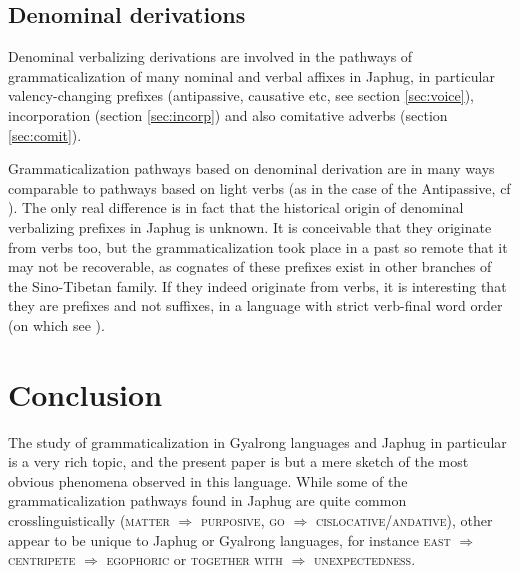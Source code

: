 \documentclass[oldfontcommands,oneside,a4paper,11pt]{article}
\begin{document}
\subsection{Denominal derivations} \label{sec:denom}
Denominal verbalizing derivations are involved in the pathways of grammaticalization of many nominal and verbal affixes in Japhug, in particular valency-changing prefixes (antipassive, causative etc, see section \ref{sec:voice}), incorporation (section \ref{sec:incorp}) and also comitative adverbs (section \ref{sec:comit}).

Grammaticalization pathways based on denominal derivation are in many ways comparable to pathways  based on light verbs (as in the case of the Antipassive, cf \citealt{creissels12antip}). The only real  difference is in fact that the historical origin of denominal verbalizing prefixes in Japhug is unknown. It is conceivable that they originate from verbs too, but the grammaticalization took place in a past so remote that it may not be recoverable, as cognates of these prefixes exist in other branches of the Sino-Tibetan family. If they indeed originate from verbs, it is interesting that they are prefixes and not suffixes, in a language with strict verb-final word order (on which see \citealt{jacques13harmonization}).  
 

\section{Conclusion} 
The study of grammaticalization in Gyalrong languages and Japhug in particular is a very rich topic, and the present paper is but a mere sketch of the most obvious phenomena observed in this language. While some of the grammaticalization pathways found in Japhug are quite common crosslinguistically (\textsc{matter} $\Rightarrow$ \textsc{purposive}, \textsc{go} $\Rightarrow$ \textsc{cislocative/andative}), other appear to be unique to Japhug or Gyalrong languages, for instance \textsc{east} $\Rightarrow$ \textsc{centripete} $\Rightarrow$ \textsc{egophoric} or \textsc{together with} $\Rightarrow$ \textsc{unexpectedness}.




\end{document}
